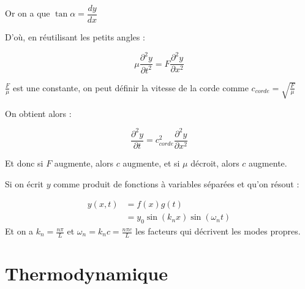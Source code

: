 \documentclass[a4paper,12pt]{book}
\begin{document}
\par Or on a que $\tan\alpha = \dfrac{dy}{dx}$
\par D'où, en réutilisant les petits angles :
\par $$\mu\dfrac{\partial^2y}{\partial t^2} = F\dfrac{\partial^2y}{\partial x^2}$$
\par $\frac{F}{\mu}$ est une constante, on peut définir la vitesse de la corde comme $c_{corde} =\sqrt{\frac{F}{\mu}}$
\par On obtient alors :
\par $$\dfrac{\partial^2y}{\partial t} = c_{corde}^2 \dfrac{\partial^2y}{\partial x^2}$$
\par Et donc si $F$ augmente, alors $c$ augmente, et si $\mu$ décroit, alors $c$ augmente. 
\par Si on écrit $y$ comme produit de fonctions à variables séparées et qu'on résout :
\par \begin{align*} y(x,t) &=f(x)g(t)\\
&=y_0\sin(k_nx)\sin(\omega_nt)
\end{align*}
Et on a $k_n = \frac{n\pi}{L}$ et $\omega_n = k_nc = \frac{n\pi c}{L}$ les facteurs qui décrivent les modes propres.


\newpage
\section{Thermodynamique}
\end{document}
